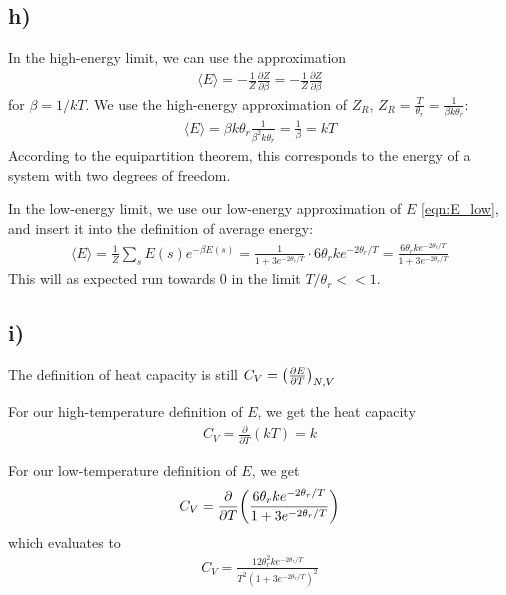 \documentclass[12p,a4paper]{article}
\renewcommand{\exp}{e^}
\newcommand{\eE}{\langle E \rangle}
\begin{document}
\subsection*{h)}
In the high-energy limit, we can use the approximation
\begin{align*}
    \eE = -\frac{1}{Z}\frac{\partial Z}{\partial \beta} = -\frac{1}{Z}\frac{\partial Z}{\partial \beta}
\end{align*}
for $\beta = 1/kT$. We use the high-energy approximation of $Z_R$, $Z_R =\frac{T}{\theta_r} = \frac{1}{\beta k \theta_r}$:
\begin{align*}
    \eE = \beta k \theta_r \frac{1}{\beta^2 k \theta_r} = \frac{1}{\beta} = kT
\end{align*}
According to the equipartition theorem, this corresponds to the energy of a system with two degrees of freedom.

In the low-energy limit, we use our low-energy approximation of $E$ \ref{eqn:E_low}, and insert it into the definition of average energy:
\begin{align*}
    \eE = \frac{1}{Z}\sum\limits_s E(s)\exp{-\beta E(s)} = \frac{1}{1 + 3\exp{-2\theta_r/T}} \cdot  6\theta_r k \exp{-2\theta_r/T}
    = \frac{6\theta_r k \exp{-2\theta_r/T}}{1+3\exp{-2\theta_r/T}}
\end{align*}
This will as expected run towards 0 in the limit $T/\theta_r << 1$.



\subsection*{i)}
The definition of heat capacity is still $C_V = \qty(\frac{\partial E}{\partial T})_{N,V}$

For our high-temperature definition of $E$, we get the heat capacity
\begin{align*}
    C_V = \frac{\partial}{\partial T}(kT) = k
\end{align*}

For our low-temperature definition of $E$, we get
\begin{align*}
    C_V = \frac{\partial}{\partial T}\qty(\frac{6\theta_r k \exp{-2\theta_r/T}}{1+3\exp{-2\theta_r/T}})
\end{align*}
which evaluates to
\begin{align*}
    C_V = \frac{12\theta_r^2k\exp{-2\theta_r/T}}{T^2(1+3\exp{-2\theta_r/T})^2}
\end{align*}
\end{document}
